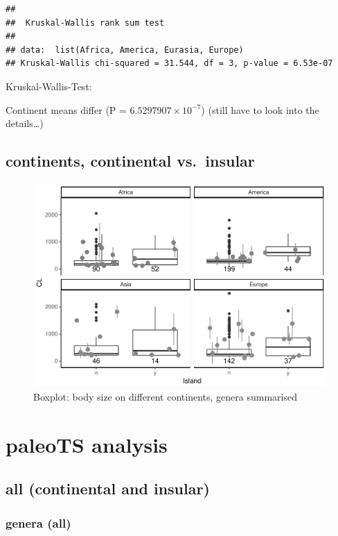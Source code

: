 \documentclass[]{article}
\begin{document}
\begin{verbatim}
## 
##  Kruskal-Wallis rank sum test
## 
## data:  list(Africa, America, Eurasia, Europe)
## Kruskal-Wallis chi-squared = 31.544, df = 3, p-value = 6.53e-07
\end{verbatim}

Kruskal-Wallis-Test:

Continent means differ (P = \(6.5297907\times 10^{-7}\)) (still have to
look into the details\ldots{})

\newpage

\subsection{continents, continental
vs.~insular}\label{continents-continental-vs.insular}

\begin{figure}[htbp]
\centering
\includegraphics{MA_JJ_files/figure-latex/BPConCI-1.pdf}
\caption{Boxplot: body size on different continents, genera summarised}
\end{figure}

\newpage

\section{paleoTS analysis}\label{paleots-analysis}

\subsection{all (continental and
insular)}\label{all-continental-and-insular}

\subsubsection{genera (all)}\label{genera-all}
\end{document}
